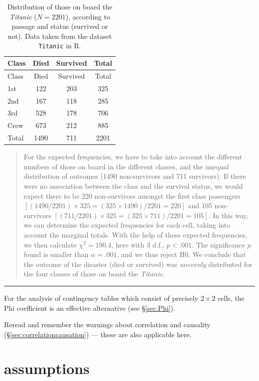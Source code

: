 \documentclass[
]{book}
\begin{document}
\begin{longtable}[]{@{}lccc@{}}
\caption{\label{tab:titanic} Distribution of those on board the \emph{Titanic} (\(N=2201\)),
according to passage
and status (survived or not). Data taken from the dataset
\texttt{Titanic} in R.}\tabularnewline
\toprule
Class & Died & Survived & Total\tabularnewline
\midrule
\endfirsthead
\toprule
Class & Died & Survived & Total\tabularnewline
\midrule
\endhead
1st & 122 & 203 & 325\tabularnewline
2nd & 167 & 118 & 285\tabularnewline
3rd & 528 & 178 & 706\tabularnewline
Crew & 673 & 212 & 885\tabularnewline
Total & 1490 & 711 & 2201\tabularnewline
\bottomrule
\end{longtable}

\begin{quote}
For the expected frequencies, we have to take into account
the different numbers of those on board in the different classes,
and the unequal distribution of outcomes (1490 non-survivors and 711
survivors). If there were no association between the class and the survival
status, we would expect there to be 220 non-survivors amongst the first class
passengers \([(1490/2201) \times 325 = (325 \times 1490) / 2201 = 220]\)
and 105 non-survivors \([(711/2201) \times 325 = (325 \times 711) / 2201 = 105]\). In this way, we can determine the expected frequencies for each cell,
taking into account the marginal totals. With the help of these
expected frequencies, we then calculate \(\chi^2=190.4\), here with 3 d.f.,
\(p<.001\). The significance \(p\) found is smaller than \(\alpha=.001\), and
we thus reject H0. We conclude that the outcome of the disaster (died or survived)
was \emph{unevenly} distributed for the four classes of those on board the \emph{Titanic}.
\end{quote}

\begin{center}\rule{0.5\linewidth}{0.5pt}\end{center}

For the analysis of contingency tables which consist of precisely
\(2\times2\) cells, the Phi coefficient is an effective alternative
(see §\ref{sec:Phi}).

Reread and remember the warnings about correlation and causality
(§\ref{sec:correlationcausation})
--- these are also applicable here.

\hypertarget{sec:chi2test-assumptions}{%
\section{assumptions}\label{sec:chi2test-assumptions}}
\end{document}
